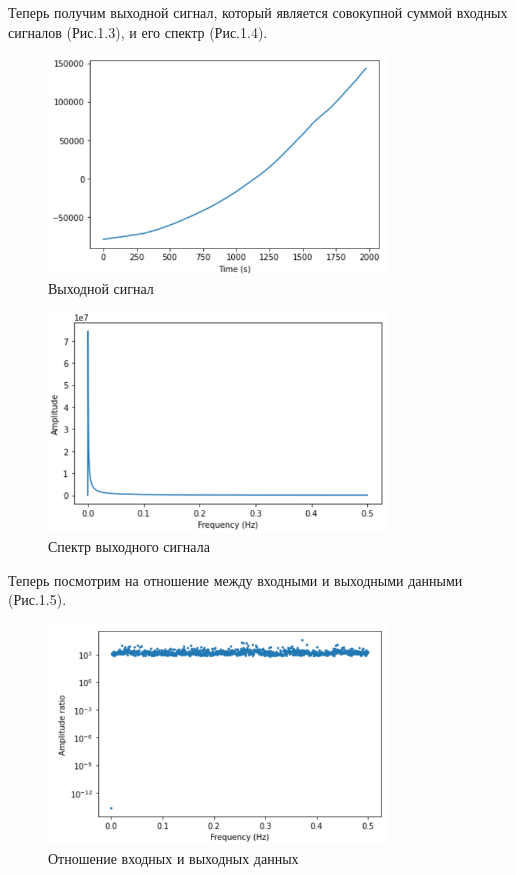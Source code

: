 \documentclass[a4paper,12pt]{report}
\begin{document}
    Теперь получим выходной сигнал, который является совокупной суммой входных сигналов (Рис.1.3), и его спектр (Рис.1.4).  
\begin{figure}[H]
        \centering
        \includegraphics[width=0.8\textwidth]{fig1-3.PNG}
        \caption{Выходной сигнал}
        \label{fig:fig1-3}
\end{figure}   
\begin{figure}[H]
        \centering
        \includegraphics[width=0.8\textwidth]{fig1-4.PNG}
        \caption{Спектр выходного сигнала}
        \label{fig:fig1-4}
\end{figure} 

    Теперь посмотрим на отношение между входными и выходными данными (Рис.1.5).
\begin{figure}[H]
        \centering
        \includegraphics[width=0.8\textwidth]{fig1-5.PNG}
        \caption{Отношение входных и выходных данных}
        \label{fig:fig1-5}
\end{figure} 
\end{document}
